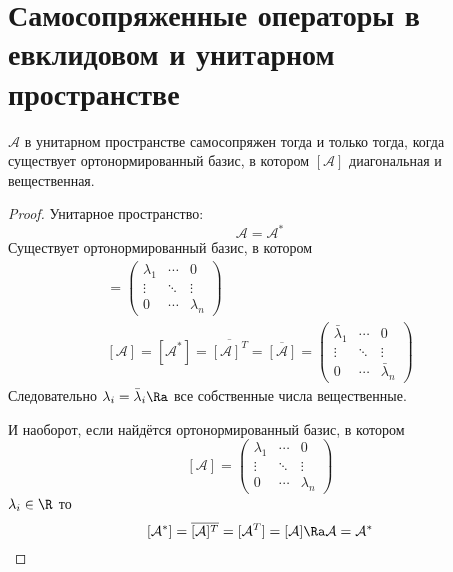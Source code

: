 \section{Самосопряженные операторы в евклидовом и унитарном пространстве}

\begin{theorem}
	$\mathcal A$ в унитарном пространстве самосопряжен тогда и только тогда, когда
	существует ортонормированный базис, в котором $[\mathcal A]$ диагональная и вещественная.
\end{theorem}
\begin{proof}
	Унитарное пространство:
	\[ \mathcal A = \mathcal{A}^* \]
	Существует ортонормированный базис, в котором
	\begin{gather*}
		[\mathcal A]
		= \begin{pmatrix}
			\lambda_1 & \cdots & 0 \\
			\vdots & \ddots & \vdots \\
			0 & \cdots & \lambda_n
		\end{pmatrix} \\
		[\mathcal A]
		= [\mathcal{A}^*]
		= \overline{[\mathcal A]^T}
		= \overline{[\mathcal A]}
		= \begin{pmatrix}
			\bar\lambda_1 & \cdots & 0 \\
			\vdots & \ddots & \vdots \\
			0 & \cdots & \bar\lambda_n
		\end{pmatrix}
	\end{gather*}
	Следовательно $\lambda_i = \bar \lambda_i \Ra$ все собственные числа вещественные. 
	
	И наоборот, если найдётся ортонормированный базис, в котором
	\[
		[\mathcal A]
		= \begin{pmatrix}
			\lambda_1 & \cdots & 0 \\
			\vdots & \ddots & \vdots \\
			0 & \cdots & \lambda_n
		\end{pmatrix}
	\]
	$\lambda_i \in \R$ 
	то
	\[
		[\mathcal A^*] = \overline{[\mathcal A]^T} = [\mathcal{A}^T] = [\mathcal A] \Ra \mathcal A = \mathcal{A}^*
	\]
\end{proof}

